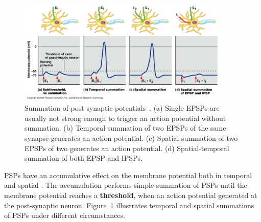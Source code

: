 


\begin{figure}[bt!]
	\centering
	\includegraphics[width=0.9\textwidth]{pics_snn/psp.png}
	\caption{Summation of post-synaptic potentials~\DIFdelbeginFL {}\DIFdelendFL \DIFaddbeginFL {}\DIFaddendFL . 
		(a) Single EPSPs are usually not strong enough to trigger an action potential without summation. (b) Temporal summation of two EPSPs of the same synapse generates an action potential. (c) Spatial summation of two EPSPs of two \DIFdelbeginFL {}\DIFdelendFL \DIFaddbeginFL {}\DIFaddendFL generates an action potential. (d) Spatial-temporal summation of both EPSP and IPSPs.
	}
	\label{Fig:psp_sum}
\end{figure}

\DIFdelbegin {}\DIFdelend \DIFaddbegin {}\DIFaddend PSPs have an accumulative effect on the membrane potential both in temporal and spatial \DIFaddbegin {}\DIFaddend .
The accumulation performs \DIFaddbegin {}\DIFaddend simple summation of PSPs until the membrane potential reaches a \textbf{threshold}, when an action potential \DIFdelbegin {}\DIFdelend \DIFaddbegin {}\DIFaddend generated at the post-synaptic neuron.
Figure~\ref{Fig:psp_sum} illustrates temporal and spatial summations of PSPs under different circumstances.

